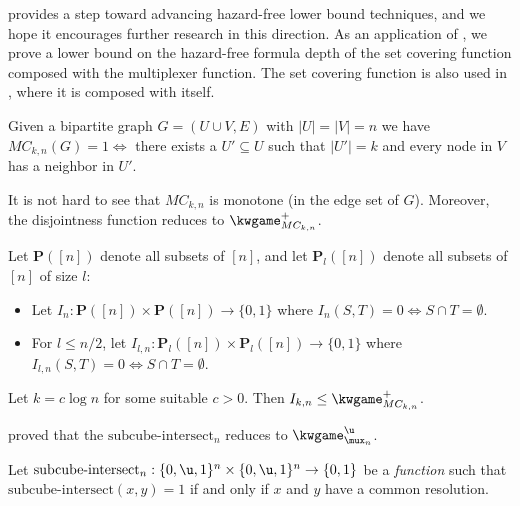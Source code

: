 \documentclass[acmsmall, nonacm, authorversion]{acmart}
\begin{document}
 provides a step toward advancing hazard-free lower bound techniques, and we hope it encourages further research in this direction. As an application of , we prove a lower bound on the hazard-free formula depth of the set covering function composed with the multiplexer function. The set covering function is also used in \cite[Theorem 13]{KRW95}, where it is composed with itself.
\begin{definition}\label{def:set-covering}
Given a bipartite graph $G=(U\cup V,E)$ with $|U|=|V|=n$ we have $MC_{k,n}(G)=1 \iff$ there exists a $U'\subseteq U$ such that $|U'|=k$ and every node in $V$ has a neighbor in $U'$.
\end{definition}

It is not hard to see that $MC_{k,n}$ is monotone (in the edge set of $G$). Moreover, the disjointness  function reduces to $\kwgame_{MC_{k,n}}^+$.
\begin{definition}\label{def:disjointness-function}
Let $\mathbf{P}([n])$ denote all subsets of $[n]$, and let $\mathbf{P}_l([n])$ denote all subsets of $[n]$ of size $l$:

\begin{itemize}
    \item Let $I_n:\mathbf{P}([n]) \times \mathbf{P}([n]) \rightarrow \{0,1\}$ where $I_n(S, T) = 0 \iff S \cap T = \emptyset$.
    \item For $l \le n/2$, let $I_{l,n}: \mathbf{P}_l([n]) \times \mathbf{P}_l([n]) \rightarrow \{0,1\}$ where $I_{l,n}(S, T) = 0 \iff S \cap T = \emptyset$.
\end{itemize}
\end{definition}

\begin{theorem}\label{thm:disjointness-to-set-covering}
Let $k=c\log n$ for some suitable $c > 0$. Then $I_{k,n}\le \kwgame^+_{MC_{k,n}}$. 
\end{theorem}

\cite{IK23} proved that the $\text{subcube-intersect}_n$ reduces to $\kwgame_{\mux_n}^\u$.

\begin{definition}
\sloppy Let $\text{subcube-intersect}_n:\{0,\u,1\}^n \times \{0,\u,1\}^n\rightarrow \{0,1\}$ be a \emph{function} such that $\text{subcube-intersect}(x,y)=1$ if and only if $x$ and $y$ have a common resolution.
\end{definition}
\end{document}
